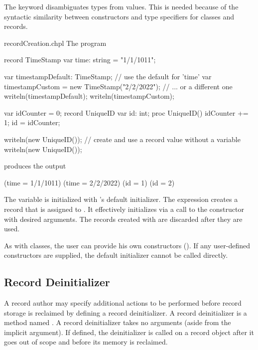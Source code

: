 \begin{rationale}

The  keyword disambiguates types from values. This is needed
because of the syntactic similarity between constructors and type
specifiers for classes and records.

\end{rationale}

\begin{chapelexample}{recordCreation.chpl}
The program
\begin{chapel}
record TimeStamp {
  var time: string = "1/1/1011";
}

var timestampDefault: TimeStamp;                  // use the default for 'time'
var timestampCustom = new TimeStamp("2/2/2022");  // ... or a different one
writeln(timestampDefault);
writeln(timestampCustom);

var idCounter = 0;
record UniqueID {
  var id: int;
  proc UniqueID() { idCounter += 1; id = idCounter; }
}

writeln(new UniqueID());  // create and use a record value without a variable
writeln(new UniqueID());
\end{chapel}
produces the output
\begin{chapelprintoutput}{}
(time = 1/1/1011)
(time = 2/2/2022)
(id = 1)
(id = 2)
\end{chapelprintoutput}
The variable  is initialized with 's
default initializer. The expression  creates a record that
is assigned to .  It effectively
initializes  via a call to the constructor with desired
arguments. The records created with  are discarded after
they are used.
\end{chapelexample}

As with classes, the user can provide his own constructors
().  If any user-defined constructors are
supplied, the default initializer cannot be called directly.

\subsection{Record Deinitializer}
\label{Record_Deinitializer}

A record author may specify additional actions to be performed before record storage is
reclaimed by defining a record deinitializer.  A record deinitializer is a method named
.  A record deinitializer takes no arguments
(aside from the implicit  argument).  If defined, the deinitializer is called
on a record object after it goes out of scope and before its memory is reclaimed.

